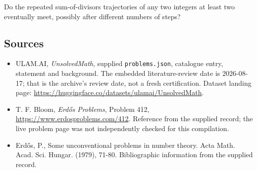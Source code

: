 \documentclass[11pt,a4paper]{article}
\begin{document}
Do the repeated sum-of-divisors trajectories of any two integers at least two eventually meet, possibly after different numbers of steps?

\subsection{Sources}

{\small

\begin{itemize}

\item[\hypertarget{source:statement:1}{S1}] ULAM.AI, \emph{UnsolvedMath}, supplied \texttt{problems.json}, catalogue entry, statement and background. The embedded literature-review date is 2026-08-17; that is the archive’s review date, not a fresh certification. Dataset landing page: \url{https://huggingface.co/datasets/ulamai/UnsolvedMath}.

\item[\hypertarget{source:statement:2}{S2}] T. F. Bloom, \emph{Erdős Problems}, Problem 412, \url{https://www.erdosproblems.com/412}. Reference from the supplied record; the live problem page was not independently checked for this compilation.

\item[\hypertarget{source:statement:3}{S3}] Erd\H{o}s, P., Some unconventional problems in number theory. Acta Math. Acad. Sci. Hungar. (1979), 71-80. Bibliographic information from the supplied record.

\end{itemize}

}

\label{end:statement}
\end{document}

